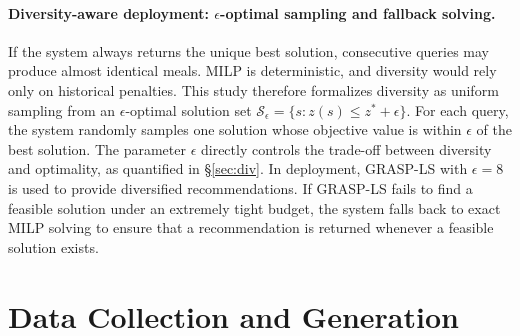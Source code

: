 \documentclass[a4paper]{article}
\begin{document}
\paragraph{Diversity-aware deployment: $\epsilon$-optimal sampling and fallback solving.}\label{par:eps}
If the system always returns the unique best solution, consecutive queries may produce almost identical meals. MILP is deterministic, and diversity would rely only on historical penalties. This study therefore formalizes diversity as uniform sampling from an $\epsilon$-optimal solution set $\mathcal{S}_\epsilon=\{s : z(s)\le z^*+\epsilon\}$. For each query, the system randomly samples one solution whose objective value is within $\epsilon$ of the best solution. The parameter $\epsilon$ directly controls the trade-off between diversity and optimality, as quantified in \S\ref{sec:div}. In deployment, GRASP-LS with $\epsilon=8$ is used to provide diversified recommendations. If GRASP-LS fails to find a feasible solution under an extremely tight budget, the system falls back to exact MILP solving to ensure that a recommendation is returned whenever a feasible solution exists.

\section{Data Collection and Generation}\label{sec:data}
\end{document}
